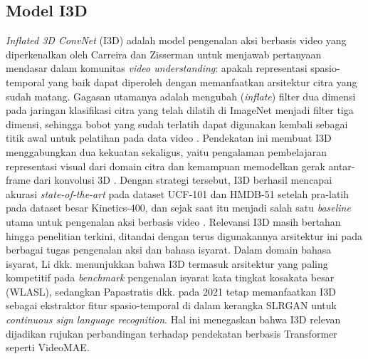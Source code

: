 \subsection{Model I3D} \label{II.I3D}
\textit{Inflated 3D ConvNet} (I3D) adalah model pengenalan aksi berbasis video yang diperkenalkan oleh Carreira dan Zisserman \cite{Carreira2017I3D} untuk menjawab pertanyaan mendasar dalam komunitas \textit{video understanding}: apakah representasi spasio-temporal yang baik dapat diperoleh dengan memanfaatkan arsitektur citra yang sudah matang. Gagasan utamanya adalah mengubah (\textit{inflate}) filter dua dimensi pada jaringan klasifikasi citra yang telah dilatih di ImageNet menjadi filter tiga dimensi, sehingga bobot yang sudah terlatih dapat digunakan kembali sebagai titik awal untuk pelatihan pada data video \cite{Carreira2017I3D}. Pendekatan ini membuat I3D menggabungkan dua kekuatan sekaligus, yaitu pengalaman pembelajaran representasi visual dari domain citra dan kemampuan memodelkan gerak antar-frame dari konvolusi 3D \cite{Tran2015,Carreira2017I3D}. Dengan strategi tersebut, I3D berhasil mencapai akurasi \textit{state-of-the-art} pada dataset UCF-101 dan HMDB-51 setelah pra-latih pada dataset besar Kinetics-400, dan sejak saat itu menjadi salah satu \textit{baseline} utama untuk pengenalan aksi berbasis video \cite{Carreira2017I3D}. Relevansi I3D masih bertahan hingga penelitian terkini, ditandai dengan terus digunakannya arsitektur ini pada berbagai tugas pengenalan aksi dan bahasa isyarat. Dalam domain bahasa isyarat, Li dkk. \cite{Li2020WLASL} menunjukkan bahwa I3D termasuk arsitektur yang paling kompetitif pada \textit{benchmark} pengenalan isyarat kata tingkat kosakata besar (WLASL), sedangkan Papastratis dkk. \cite{Papastratis2021SLRGAN} pada 2021 tetap memanfaatkan I3D sebagai ekstraktor fitur spasio-temporal di dalam kerangka SLRGAN untuk \textit{continuous sign language recognition}. Hal ini menegaskan bahwa I3D relevan dijadikan rujukan perbandingan terhadap pendekatan berbasis Transformer seperti VideoMAE.\par


